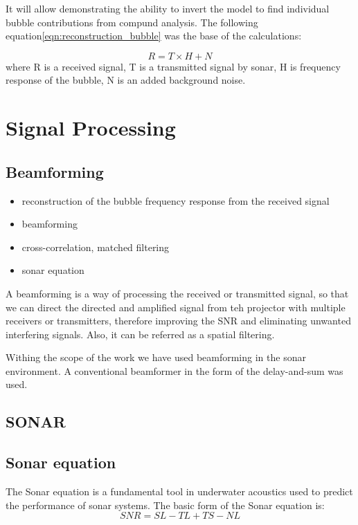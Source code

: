 It will allow demonstrating the ability to invert the model to find individual bubble contributions from compund analysis.
The following equation\ref{eqn:reconstruction_bubble} was the base of the calculations:

\begin{equation}\label{eqn:reconstruction_bubble}
    R = T \times H + N
\end{equation}
where R is a received signal, T is a transmitted signal by sonar, H is frequency response of the bubble, N is an added background noise.

\section{Signal Processing}
\subsection{Beamforming}
\begin{itemize}
    \item reconstruction of the bubble frequency response from the received signal
    \item beamforming
    \item cross-correlation, matched filtering
    \item sonar equation
\end{itemize}

A beamforming is a way of processing the received or transmitted signal, so that we can direct the directed and amplified signal from teh projector with multiple receivers or transmitters, therefore improving the SNR and eliminating unwanted interfering signals. Also, it can be referred as a spatial filtering.

Withing the scope of the work we have used beamforming in the sonar environment. A conventional beamformer in the form of the delay-and-sum was used. 
\subsection{SONAR}
\subsection{Sonar equation }
The Sonar equation is a fundamental tool in underwater acoustics used to predict the performance of sonar systems. 
The basic form of the Sonar equation is:
\begin{equation}
    SNR=SL-TL+TS-NL
\end{equation}

